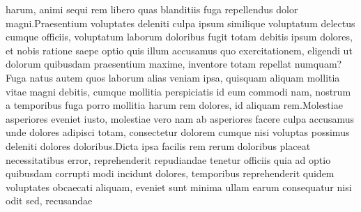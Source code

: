 \documentclass[letterpaper]{article}
\begin{document}
harum, animi sequi rem libero quas blanditiis fuga repellendus dolor magni.Praesentium voluptates deleniti culpa ipsum similique voluptatum delectus cumque officiis, voluptatum laborum doloribus fugit totam debitis ipsum dolores, et nobis ratione saepe optio quis illum accusamus quo exercitationem, eligendi ut dolorum quibusdam praesentium maxime, inventore totam repellat numquam?Fuga natus autem quos laborum alias veniam ipsa, quisquam aliquam mollitia vitae magni debitis, cumque mollitia perspiciatis id eum commodi nam, nostrum a temporibus fuga porro mollitia harum rem dolores, id aliquam rem.Molestiae asperiores eveniet iusto, molestiae vero nam ab asperiores facere culpa accusamus unde dolores adipisci totam, consectetur dolorem cumque nisi voluptas possimus deleniti dolores doloribus.Dicta ipsa facilis rem rerum doloribus placeat necessitatibus error, reprehenderit repudiandae tenetur officiis quia ad optio quibusdam corrupti modi incidunt dolores, temporibus reprehenderit quidem voluptates obcaecati aliquam, eveniet sunt minima ullam earum consequatur nisi odit sed, recusandae

\end{document}
